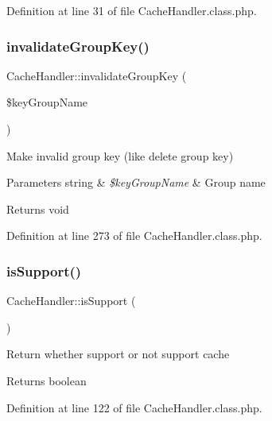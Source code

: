 Definition at line 31 of file Cache\+Handler.\+class.\+php.

\mbox{\label{classCacheHandler_a43118f91508ad5695a13f7a332cc9389}} 
\subsubsection{\texorpdfstring{invalidate\+Group\+Key()}{invalidateGroupKey()}}
{\footnotesize\ttfamily Cache\+Handler\+::invalidate\+Group\+Key (\begin{DoxyParamCaption}\item[{}]{\$key\+Group\+Name }\end{DoxyParamCaption})}

Make invalid group key (like delete group key)


\begin{DoxyParams}[1]{Parameters}
string & {\em \$key\+Group\+Name} & Group name \\
\hline
\end{DoxyParams}
\begin{DoxyReturn}{Returns}
void 
\end{DoxyReturn}


Definition at line 273 of file Cache\+Handler.\+class.\+php.

\mbox{\label{classCacheHandler_a4c137721670e0e9ce1d60bdd2f7235bb}} 
\subsubsection{\texorpdfstring{is\+Support()}{isSupport()}}
{\footnotesize\ttfamily Cache\+Handler\+::is\+Support (\begin{DoxyParamCaption}{ }\end{DoxyParamCaption})}

Return whether support or not support cache

\begin{DoxyReturn}{Returns}
boolean 
\end{DoxyReturn}


Definition at line 122 of file Cache\+Handler.\+class.\+php.

